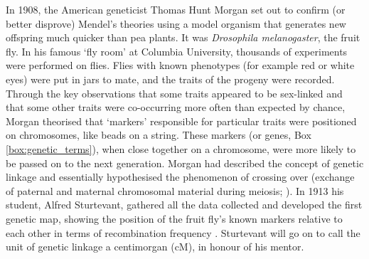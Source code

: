 In 1908, the American geneticist Thomas Hunt Morgan set out to confirm (or better disprove) Mendel’s theories using a model organism that generates new offspring much quicker than pea plants. 
It was \textit{Drosophila melanogaster}, the fruit fly. 
In his famous `fly room' at Columbia University, thousands of experiments were performed on flies. 
Flies with known phenotypes (for example red or white eyes) were put in jars to mate, and the traits of the progeny were recorded. 
Through the key observations that some traits appeared to be sex-linked and that some other traits were co-occurring more often than expected by chance, Morgan theorised that `markers' responsible for particular traits were positioned on chromosomes, like beads on a string. 
These markers (or genes, Box \ref{box:genetic_terms}), when close together on a chromosome, were more likely to be passed on to the next generation. 
Morgan had described the concept of genetic linkage and essentially hypothesised the phenomenon of crossing over (exchange of paternal and maternal chromosomal material during meiosis; \cite{morgan1911random}). 
In 1913 his student, Alfred Sturtevant, gathered all the data collected and developed the first genetic map, showing the position of the fruit fly’s known markers relative to each other in terms of recombination frequency \cite{sturtevant1913linear}. 
Sturtevant will go on to call the unit of genetic linkage a centimorgan (cM), in honour of his mentor.\\



